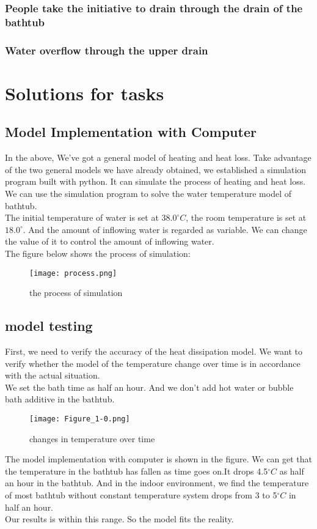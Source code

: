 \documentclass{mcmthesis}
\begin{document}
\subsubsection{People take the initiative to drain through the drain of the bathtub}

\subsubsection{Water overflow through the upper drain}
\section{Solutions for tasks}
\subsection{Model Implementation with Computer}
\indent In the above, We've got a general model of heating and heat loss. Take advantage of the two general models we have already obtained, we established a simulation program built with python. It can simulate the process of heating and heat loss. We can use the simulation program to solve the water temperature model of bathtub.\\
\indent The initial temperature of water is set at $38.0^{\circ}C$, the room temperature is set at $18.0^{\circ}$. And the amount of inflowing water is regarded as variable. We can change the value of it to control the amount of inflowing water.\\
\indent The figure below shows the process of simulation:
 \begin{figure}[H]
\centerline{\texttt{[image: process.png]}}
\caption{the process of simulation}                  %
\label{oval}	
\end{figure}

\subsection{model testing}			%
\indent First, we need to verify the accuracy of the heat dissipation model.
We want to verify whether the model of the temperature change over time is in accordance with the actual situation.\\
\indent We set the bath time as half an hour. And we don't add hot water or bubble bath additive in the bathtub. \\
\begin{figure}[H]
\centerline{\texttt{[image: Figure\_1-0.png]}}
\caption{changes in temperature over time}
\label{oval}	
\end{figure}
\indent The model implementation with computer is shown in the figure.
We can get that the temperature in the bathtub has fallen as time goes on.It drops 4.5$^{\circ}C$ as half an hour in the bathtub. And in the indoor environment, we find the temperature of most bathtub without constant temperature system drops from 3 to 5$^{\circ}C$ in half an hour. \\ \indent Our results is within this range. So the model fits the reality.               
\end{document}
